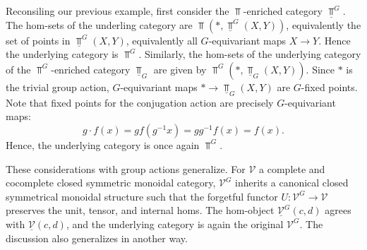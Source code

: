 Reconsiling our previous example, first consider the $\Top $-enriched category $\underline{\Top } ^G$. The hom-sets of the underling category are $\Top (*,\underline{\Top } ^G(X,Y))$, equivalently the set of points in $\underline{\Top } ^G(X,Y)$, equivalently all $G$-equivariant maps $X\to Y$. Hence the underlying category is $\Top ^G$. Similarly, the hom-sets of the underlying category of the $\Top ^G$-enriched category $\underline{\Top } _G$ are given by $\Top ^G(*,\underline{\Top } _G(X,Y))$. Since $*$ is the trivial group action, $G$-equivariant maps $*\to \underline{\Top } _G(X,Y)$ are $G$-fixed points. Note that fixed points for the conjugation action are precisely $G$-equivariant maps:
\[
	g\cdot f(x)=gf(g^{-1} x)=gg^{-1} f(x)=f(x)
.\]
Hence, the underlying category is once again $\Top ^G$.

These considerations with group actions generalize. For $\mathcal{V} $ a complete and cocomplete closed symmetric monoidal category, $\mathcal{V} ^G$ inherits a canonical closed symmetrical monoidal structure such that the forgetful functor $U : \mathcal{V} ^G \to \mathcal{V} $ preserves the unit, tensor, and internal homs. The hom-object $\underline{\mathcal{V} } ^G(c,d)$ agrees with $\underline{\mathcal{V} } (c,d)$, and the underlying category is again the original $\mathcal{V} ^G$. The discussion also generalizes in another way.

